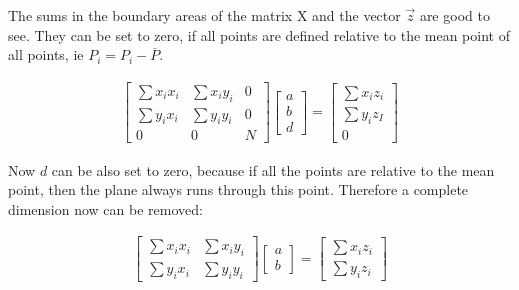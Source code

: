 \documentclass[11pt,oneside,openright]{mpreport}
\begin{document}
The sums in the boundary areas of the matrix X and the vector $\vec{z}$ are good to see. They can be set to zero, if all points are defined relative to the mean point of all points,
ie $P_i = P_i - \overline{P}$.

\begin{align*}
\begin{bmatrix}
\sum x_i x_i & \sum x_i y_i & 0 \\
\sum y_i x_i & \sum y_i y_i & 0 \\
0 & 0 & N
\end{bmatrix} 
\begin{bmatrix}
a \\
b \\
d 
\end{bmatrix} 
 = 
\begin{bmatrix}
\sum x_i z_i \\
\sum y_i z_I \\
0 
\end{bmatrix} 
\end{align*}

Now $d$ can be also set to zero, because if all the points are relative to the mean point, then the plane always runs through this point. Therefore a complete dimension now can be removed:

\begin{align*}
\begin{bmatrix}
\sum x_i x_i & \sum x_i y_i \\
\sum y_i x_i & \sum y_i y_i
\end{bmatrix} 
\begin{bmatrix}
a \\
b 
\end{bmatrix} 
 = 
\begin{bmatrix}
\sum x_i z_i \\
\sum y_i z_i
\end{bmatrix} 
\end{align*}
\end{document}
